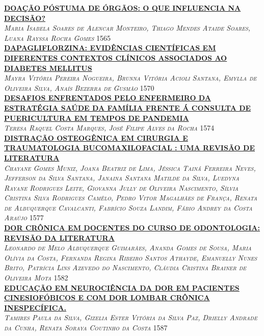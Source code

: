 \noindent \textsc{\hyperlink{trabalhos/249943.pdf.1}{\textbf{DOAÇÃO PÓSTUMA DE ÓRGÃOS: O QUE INFLUENCIA NA DECISÃO?}}}\\ 
\noindent \textsc{\textit{Maria Isabela Soares de Alencar Monteiro, Thiago Mendes Ataide Soares, Luana Rayssa Rocha Gomes}} \hfill 1565\\ 

\noindent \textsc{\hyperlink{trabalhos/251150.pdf.1}{\textbf{DAPAGLIFLORZINA: EVIDÊNCIAS CIENTÍFICAS EM DIFERENTES CONTEXTOS CLÍNICOS ASSOCIADOS AO DIABETES MELLITUS }}}\\ 
\noindent \textsc{\textit{Mayra Vitória Pereira Nogueira, Brunna Vitória Acioli Santana, Emylla de Oliveira Silva, Anaís Bezerra de Gusmão}} \hfill 1570\\ 

\noindent \textsc{\hyperlink{trabalhos/247530.pdf.1}{\textbf{DESAFIOS ENFRENTADOS PELO ENFERMEIRO DA ESTRATÉGIA SAÚDE DA FAMÍLIA FRENTE Á CONSULTA DE PUERICULTURA EM TEMPOS DE PANDEMIA }}}\\ 
\noindent \textsc{\textit{Teresa Raquel Costa Marques, José Filipe Alves da Rocha}} \hfill 1574\\ 

\noindent \textsc{\hyperlink{trabalhos/249629.pdf.1}{\textbf{DISTRAÇÃO OSTEOGÊNICA EM CIRURGIA E TRAUMATOLOGIA BUCOMAXILOFACIAL : UMA REVISÃO DE LITERATURA}}}\\ 
\noindent \textsc{\textit{Chayane Gomes Muniz, Joana Beatriz de Lima, Jéssica Tainá Ferreira Neves, Jefferson da Silva Santana, Janaina Santana Matilde da Silva, Luedyna Rayane Rodrigues Leite, Giovanna Jully de Oliveira Nascimento, Sílvia Cristina Silva Rodrigues Camêlo, Pedro Vitor Magalhães de França, Renata de Albuquerque Cavalcanti, Fabrício Souza Landim, Fábio Andrey da Costa Araújo}} \hfill 1577\\ 

\noindent \textsc{\hyperlink{trabalhos/251810.pdf.1}{\textbf{DOR CRÔNICA EM DOCENTES DO CURSO DE ODONTOLOGIA: REVISÃO DA LITERATURA}}}\\ 
\noindent \textsc{\textit{Leonardo de Melo Albuquerque Guimarães, Ananda Gomes de Sousa, Maria Olívia da Costa, Fernanda Regina Ribeiro Santos Athayde, Emanuelly Nunes Brito, Patrícia Lins Azevedo do Nascimento, Cláudia Cristina Brainer de Oliveira Mota}} \hfill 1582\\ 

\noindent \textsc{\hyperlink{trabalhos/250322.pdf.1}{\textbf{EDUCAÇÃO EM NEUROCIÊNCIA DA DOR EM PACIENTES CINESIOFÓBICOS E COM DOR LOMBAR CRÔNICA INESPECÍFICA.}}}\\ 
\noindent \textsc{\textit{Tamires Paula da Silva, Gizelia Ester Vitória da Silva Paz, Drielly Andrade da Cunha, Renata Soraya Coutinho da Costa}} \hfill 1587\\ 

